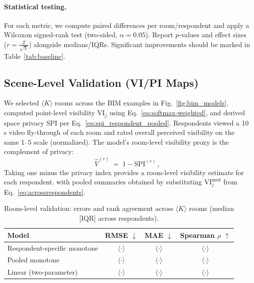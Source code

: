 \documentclass[final,3p,times,review]{elsarticle}
\begin{document}
\paragraph{Statistical testing.}
For each metric, we compute paired differences per room/respondent and apply a Wilcoxon signed-rank test (two-sided, $\alpha{=}0.05$). Report $p$-values and effect sizes ($r{=}\tfrac{Z}{\sqrt{N}}$) alongside medians/IQRs. Significant improvements should be marked in Table~\ref{tab:baseline}.

\subsection{Scene-Level Validation (VI/PI Maps)}
We selected $\langle K \rangle$ rooms across the BIM examples in Fig.~\ref{fig:bim_models}, computed point-level visibility $\mathrm{VI}_j$ using Eq.~\eqref{eq:softmax-weighted}, and derived space privacy $\mathrm{SPI}$ per Eq.~\eqref{eq:spi_respondent_pooled}. Respondents viewed a 10\,s video fly-through of each room and rated overall perceived visibility on the same 1--5 scale (normalized). The model’s room-level visibility proxy is the complement of privacy:
\begin{equation}
\widehat{V}^{(r)} \;=\; 1 - \mathrm{SPI}^{(r)} \,,
\label{eq:room-visibility-proxy}
\end{equation}
Taking one minus the privacy index provides a room-level visibility estimate for each respondent.
with pooled summaries obtained by substituting $\mathrm{VI}_j^{\mathrm{med}}$ from Eq.~\eqref{eq:acrossrespondents}.

\begin{table}[H]
\centering
\caption{Room-level validation: errors and rank agreement across $\langle K\rangle$ rooms (median [IQR] across respondents).}
\label{tab:room-validation}
\begin{tabular}{@{}lccc@{}}
\toprule
Model & RMSE $\downarrow$ & MAE $\downarrow$ & Spearman $\rho$ $\uparrow$ \\
\midrule
Respondent-specific monotone & $\langle \cdot \rangle$ & $\langle \cdot \rangle$ & $\langle \cdot \rangle$ \\
Pooled monotone & $\langle \cdot \rangle$ & $\langle \cdot \rangle$ & $\langle \cdot \rangle$ \\
Linear (two-parameter) & $\langle \cdot \rangle$ & $\langle \cdot \rangle$ & $\langle \cdot \rangle$ \\
\bottomrule
\end{tabular}
\end{table}
\end{document}
